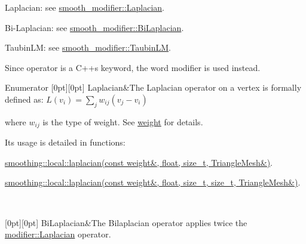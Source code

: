 \begin{DoxyItemize}
\item Laplacian\+: see \hyperlink{namespacegeoproc_a396280579199558902594f4df72c01c7a799723f39baf497704a3d39e7c03555f}{smooth\+\_\+modifier\+::\+Laplacian}.
\item Bi-\/\+Laplacian\+: see \hyperlink{namespacegeoproc_a396280579199558902594f4df72c01c7a0890724bffb79f511bc768c0529dce3f}{smooth\+\_\+modifier\+::\+Bi\+Laplacian}.
\item Taubin\+LM\+: see \hyperlink{namespacegeoproc_a396280579199558902594f4df72c01c7ad69ec4945f39affa518f05fa077b00ae}{smooth\+\_\+modifier\+::\+Taubin\+LM}.
\end{DoxyItemize}

Since \textquotesingle{}operator\textquotesingle{} is a C++\textquotesingle{}s keyword, the word \textquotesingle{}modifier\textquotesingle{} is used instead. \begin{DoxyEnumFields}{Enumerator}
[0pt][0pt]{}\mbox{\label{namespacegeoproc_a396280579199558902594f4df72c01c7a799723f39baf497704a3d39e7c03555f}} 
Laplacian&The Laplacian operator on a vertex is formally defined as\+: $ L(v_i) = \sum_{j} w_{ij}(v_j - v_i) $

where $w_{ij}$ is the type of weight. See \hyperlink{namespacegeoproc_a12e5a10581b53b9dd9a509127527f843}{weight} for details.

Its usage is detailed in functions\+:
\begin{DoxyItemize}
\item \hyperlink{namespacegeoproc_1_1smoothing_1_1local_afc087060b0ce1c1ce40b8e5a9969e843}{smoothing\+::local\+::laplacian(const weight\&, float, size\+\_\+t, Triangle\+Mesh\&)}.
\item \hyperlink{namespacegeoproc_1_1smoothing_1_1local_a1b6e158caeaf3ae121b47fab6c6edbf9}{smoothing\+::local\+::laplacian(const weight\&, float, size\+\_\+t, size\+\_\+t, Triangle\+Mesh\&)}. 
\end{DoxyItemize}\\
\hline

[0pt][0pt]{}\mbox{\label{namespacegeoproc_a396280579199558902594f4df72c01c7a0890724bffb79f511bc768c0529dce3f}} 
Bi\+Laplacian&The Bilaplacian operator applies twice the \hyperlink{namespacegeoproc_a396280579199558902594f4df72c01c7a799723f39baf497704a3d39e7c03555f}{modifier\+::\+Laplacian} operator.


\end{DoxyEnumFields}
